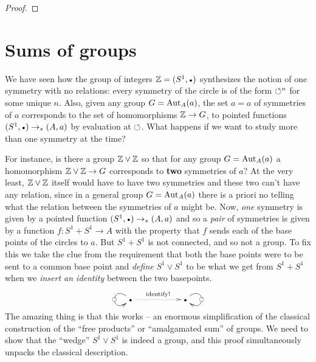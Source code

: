 {\begin{proof}
\end{proof}



\section{Sums of groups}
\label{sec:coprod}
We have seen how the group of integers $\ZZ=(S^1,\base)$ synthesizes the notion of one symmetry with no relations: every symmetry of the circle is of the form $\circlearrowleft^n$ for some unique $n$.  Also, given any group $G=\mathrm{Aut}_A(a)$, the set $a=a$ of symmetries of $a$ corresponds to the set of homomorphisms $\mathbb{Z}\to G$, \ie to pointed functions $(S^1,\base)\to_*(A,a)$ by evaluation at $\circlearrowleft$.  What happens if we want to study more than one symmetry at the time?  

For instance, is there a group $\ZZ\vee%
\ZZ$ so that for any group $G=\mathrm{Aut}_A(a)$ a homomorphism $\ZZ\vee%
\ZZ\to G$ corresponds to {\bf two} symmetries of $a$?  
At the very least, $\mathbb{Z}\vee\mathbb{Z}$ itself would have to have two symmetries and these two can't have any relation, since in a general group $G=\mathrm{Aut}_A(a)$ there is a priori no telling what the relation between the symmetries of $a$ might be.  
Now, \emph{one} symmetry is given by a pointed function $(S^1,\base)\to_*(A,a)$ and so a \emph{pair} of symmetries is given by a function $f:S^1+S^1\to A$ with the property that $f$ sends each of the base points of the circles to $a$.  But $S^1+S^1$ is not connected, and so not a group.  To fix this we take the clue from the requirement that both the base points were to be sent to a common base point and \emph{define} $S^1\vee S^1$ to be what we get from $S^1+S^1$ when we \emph{insert an identity} between the two basepoints.
$$\xymatrix{\base\ar@(ul,dl)[]|{\Sloop}\ar@{.>}[rr]^{\text{identify!}}&&\base\ar@(ur,dr)[]|{\Sloop}}
$$
The amazing thing is that this works -- an enormous simplification of the classical construction of the ``free products'' or ``amalgamated sum'' of groups.  We need to show that the ``wedge'' $S^1\vee S^1$ is indeed a group, and this proof simultaneously unpacks the classical description.

}
